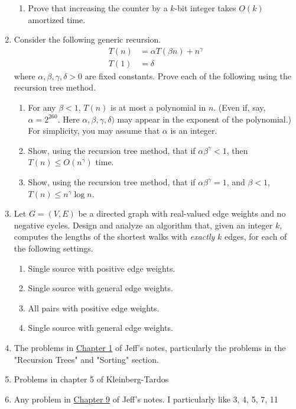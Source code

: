 \documentclass{article}
\begin{document}
\begin{enumerate}
\begin{enumerate}
    \item Prove that increasing the counter by a $k$-bit integer takes $O(k)$ amortized time.
    \end{enumerate}
    \item Consider the following generic recursion.
    \begin{align*}
        T(n) &= \alpha T(\beta n) + n^{\gamma}
        \\
        T(1) &= \delta
    \end{align*}
    where $\alpha, \beta, \gamma, \delta > 0$ are fixed constants. Prove each of the following using the recursion tree method.
    \begin{enumerate}
        \item For any $\beta < 1$, $T(n)$ is at most a polynomial in $n$. (Even if, say, $\alpha= 2^{260}$. Here $\alpha, \beta, \gamma, \delta)$ may appear in the exponent of the polynomial.) For simplicity, you may assume that $\alpha$ is an integer.
        \item Show, using the recursion tree method, that if $\alpha \beta^\gamma < 1$, then $T(n) \leq O(n^{\gamma})$ time.
        \item Show, using the recursion tree method, that if $\alpha \beta^{\gamma}= 1$, and $\beta < 1$, $T(n) \leq n^{\gamma} \log{n}$.
    \end{enumerate}
    \item Let $G = (V,E)$ be a directed graph with real-valued edge weights and no negative cycles. Design and analyze an algorithm that, given an integer $k$, computes the lengths of the shortest walks with \emph{exactly} $k$ edges, for each of the following settings.
    \begin{enumerate}
    \item Single source with positive edge weights.
    \item Single source with general edge weights.
    \item All pairs with positive edge weights.
    \item Single source with general edge weights.
    \end{enumerate}
    \item The problems in \href{http://jeffe.cs.illinois.edu/teaching/algorithms/book/01-recursion.pdf}{Chapter 1} of Jeff's notes, particularly the problems in the "Recursion Trees" and "Sorting" section.
    \item Problems in chapter 5 of Kleinberg-Tardos
    \item Any problem in \href{http://jeffe.cs.illinois.edu/teaching/algorithms/notes/09-amortize.pdf}{Chapter 9} of Jeff's notes. I particularly like 3, 4, 5, 7, 11

\end{enumerate}
\end{document}
